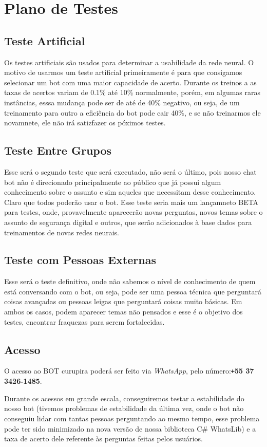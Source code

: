 \chapter{Plano de Testes}
\section{Teste Artificial}
    Os testes artificiais são usados para determinar a usabilidade da rede neural. O motivo de usarmos um teste artificial primeiramente é para que consigamos selecionar um bot com uma maior capacidade de acerto. Durante os treinos a as taxas de acertos variam de 0.1\% até 10\% normalmente, porém, em algumas raras instâncias, esssa mudança pode ser de até de 40\% negativo, ou seja, de um treinamento para outro a eficiência do bot pode cair 40\%, e se não treinarmos ele novamnete, ele não irá satizfazer os póximos testes.
\section{Teste Entre Grupos}
    Esse será o segundo teste que será executado, não será o último, pois nosso chat bot não é direcionado principalmente ao público que já possui algum conhecimento sobre o assunto e sim aqueles que necessitam desse conhecimento. Claro que todos poderão usar o bot. Esse teste seria mais um lançamneto BETA para testes, onde, provavelmente aparecerão novas perguntas, novos temas sobre o assunto de segurança digital e outros, que serão adicionados à base dados para treinamentos de novas redes neurais.
\section{Teste com Pessoas Externas}
    Esse será o teste definitivo, onde não sabemos o nível de conhecimento de quem está conversando com o bot, ou seja, pode ser uma pessoa técnica que perguntará coisas avançadas ou pessoas leigas que perguntará coisas muito básicas. Em ambos os casos, podem aparecer temas não pensados e esse é o objetivo dos testes, encontrar fraquezas para serem fortalecidas.
\section{Acesso}
    O acesso ao BOT curupira poderá ser feito via \textit{WhatsApp}, pelo número:\newline \textbf{\texttt{+}55 37 3426-1485}.\par
    
    Durante os acessos em grande escala, conseguiremos testar a estabilidade do nosso bot (tivemos problemas de estabilidade da última vez, onde o bot não conseguiu lidar com tantas pessoas perguntando ao mesmo tempo, esse problema pode ter sido minimizado na nova versão de nossa biblioteca C\# WhatsLib) e a taxa de acerto dele referente às perguntas feitas pelos usuários.
